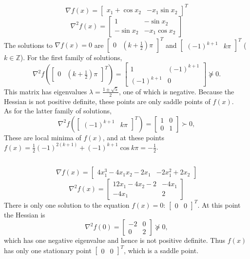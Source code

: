 \documentclass[11pt]{article}
\begin{document}
\subsection{}
$$\nabla f(x)=\begin{bmatrix}x_1+\cos x_2&-x_1\sin x_2\end{bmatrix}^T$$
$$\nabla^2f(x)=\begin{bmatrix}1&-\sin x_2\\-\sin x_2 & -x_1\cos x_2\end{bmatrix}$$
The solutions to $\nabla f(x)=0$ are $\begin{bmatrix} 0 & (k+\frac{1}{2})\pi\end{bmatrix}^T$ and $\begin{bmatrix} (-1)^{k+1} & k\pi \end{bmatrix}^T$ ($k\in \mathbb{Z}$). For the first family of solutions, $$\nabla ^2f(\begin{bmatrix} 0 & (k+\frac{1}{2})\pi\end{bmatrix}^T )=\begin{bmatrix} 1 & (-1)^{k+1} \\ (-1)^{k+1} & 0\end{bmatrix}\nsucceq0.$$ This matrix has eigenvalues $\lambda=\frac{1\pm\sqrt{5}}{2}$, one of which is negative. Because the Hessian is not positive definite, these points are only saddle points of $f(x)$.\\ 
As for the latter family of solutions, $$\nabla ^2f(\begin{bmatrix} (-1)^{k+1} & k\pi\end{bmatrix}^T )=\begin{bmatrix} 1 & 0 \\ 0 & 1\end{bmatrix}\succ0,$$  These are local minima of $f(x)$, and at these points $f(x)=\frac{1}{2}(-1)^{2(k+1)}+(-1)^{k+1}\cos {k\pi}=-\frac{1}{2}$. 

\subsection{}
$$\nabla f(x) =\begin{bmatrix} 4x_1^3-4x_1x_2-2x_1 & -2x_1^2+2x_2\end{bmatrix} $$
$$\nabla^2 f(x)=\begin{bmatrix} 12x_1-4x_2-2 &-4x_1\\-4x_1 & 2\end{bmatrix} $$
There is only one solution to the equation $f(x)=0$: $\begin{bmatrix} 0&0\end{bmatrix}^T$. At this point the Hessian is $$\nabla^2f(0)=\begin{bmatrix}-2 & 0\\ 0 &2\end{bmatrix}\nsucceq0,$$ which has one negative eigenvalue and hence is not positive definite. Thus $f(x)$ has only one stationary point $\begin{bmatrix} 0&0\end{bmatrix} ^T$, which is a saddle point.
\end{document}
